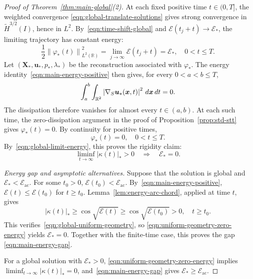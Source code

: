 \documentclass[11pt,reqno]{amsart}
\theoremstyle{plain}
\theoremstyle{definition}
\numberwithin{equation}{section}
\newcommand{\grad}[1]{\nabla #1}
\newcommand{\mc}[1]{\mathcal{#1}}
\newcommand{\wt}[1]{\widetilde{#1}}
\newcommand{\bm}[1]{\boldsymbol{#1}}
\newcommand{\abs}[1]{\left\lvert #1 \right\rvert}
\newcommand{\norm}[1]{\left\lVert #1 \right\rVert}
\newcommand{\vph}{\varphi}
\newcommand{\R}{\mathbb{R}}
\newcommand{\thi}[1]{\wt H^{#1}(I)}
\begin{document}
\begin{proof}[Proof of Theorem~\ref{thm:main-global}(2)]
At each fixed positive time $t\in(0,T]$, the weighted convergence
\eqref{eqn:global-translate-solutions} gives strong convergence in
$\thi{3/2}$, hence in $L^2$. By~\eqref{eqn:time-shift-global} and
$\mc E(t_j+t)\to\mc E_*$, the limiting trajectory has constant energy:
\begin{equation}\label{eqn:global-limit-energy}
    \frac12\norm{\vph_*(t)}_{L^2(\R)}^2
    =\lim_{j\to\infty}\mc E(t_j+t)
    =\mc E_*,
    \quad 0<t\le T.
\end{equation}
Let $(\bm X_*,\bm u_*,p_*,\lambda_*)$ be the reconstruction associated with $\vph_*$.
The energy identity~\eqref{eqn:main-energy-positive} then gives,
for every $0<a<b\le T$,
\begin{equation}
    \int_a^b\int_{\R^2}
    \abs{\grad_S\bm u_*(\bm x,t)}^2\,d\bm x\,dt=0.
\end{equation}
The dissipation therefore vanishes for almost every $t\in(a,b)$. At each
such time, the zero-dissipation argument in the proof of
Proposition~\ref{prop:std-stt} gives $\vph_*(t)=0$. By continuity for positive
times,
\begin{equation}
    \vph_*(t)=0,
    \quad 0<t\le T.
\end{equation}
By~\eqref{eqn:global-limit-energy}, this proves the rigidity claim:
\begin{equation}\label{eqn:uniform-geometry-zero-energy}
    \liminf_{t\to\infty}\abs{\kappa(t)}_*>0
    \quad\Longrightarrow\quad
    \mc E_*=0.
\end{equation}

\emph{Energy gap and asymptotic alternatives.}
Suppose that the solution is global and
$\mc E_*<\mc E_{\mathrm{ac}}$. For some $t_0>0$,
$\mc E(t_0)<\mc E_{\mathrm{ac}}$. By~\eqref{eqn:main-energy-positive},
$\mc E(t)\le \mc E(t_0)$ for $t\ge t_0$. Lemma~\ref{lem:energy-arc-chord},
applied at time $t$, gives
\begin{equation}\label{eqn:eventual-energy-geometry}
    \abs{\kappa(t)}_*
    \ge\cos\sqrt{\mc E(t)}
    \ge\cos\sqrt{\mc E(t_0)}>0,
    \quad t\ge t_0.
\end{equation}
This verifies~\eqref{eqn:global-uniform-geometry}, so
\eqref{eqn:uniform-geometry-zero-energy} yields $\mc E_*=0$.
Together with the finite-time case, this proves the gap
\eqref{eqn:main-energy-gap}.

For a global solution with $\mc E_*>0$,
\eqref{eqn:uniform-geometry-zero-energy} implies
$\liminf_{t\to\infty}\abs{\kappa(t)}_*=0$, and~\eqref{eqn:main-energy-gap}
gives $\mc E_*\ge\mc E_{\mathrm{ac}}$.


\end{proof}
\end{document}
